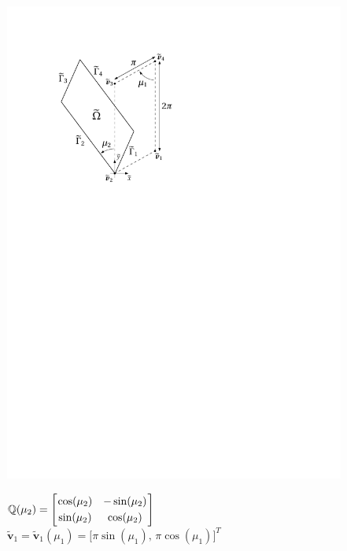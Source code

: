 \documentclass[12pt, a4paper, twoside, openright, notitlepage]{report}
\numberwithin{equation}{chapter}
\theoremstyle{theorem}
\theoremstyle{definition}
\theoremstyle{remark}
\theoremstyle{proposition}
\numberwithin{figure}{chapter}
\newcommand{\wt}[1]{\widetilde{#1}}
\newcommand{\bg}[1]{\boldsymbol{#1}}
\begin{document}
		\begin{figure}[H]
			\begin{minipage}{0.4\textwidth}
				\center
				\includegraphics[scale = 0.65]{domain_square_ext}
			\end{minipage}
			\hfill
			\begin{minipage}{0.5\textwidth}
				$\mathbb{Q}(\mu_2) =
				\begin{bmatrix}
				\hspace*{-0.15cm}
				\begin{array}{cc}
					\cos(\mu_2) & -\sin(\mu_2) \\[0.1cm]
					\sin(\mu_2) & \cos(\mu_2)
				\end{array} 
				\hspace*{-0.15cm}
				\end{bmatrix}
				$ \\[0.3cm]
				$\wt{\bg{v}}_1 = \wt{\bg{v}}_1(\mu_1) = \big[ \pi \sin(\mu_1), \, \pi \cos(\mu_1) \big]^T$ \\[0.2cm]

\end{minipage}
\end{figure}
\end{document}
